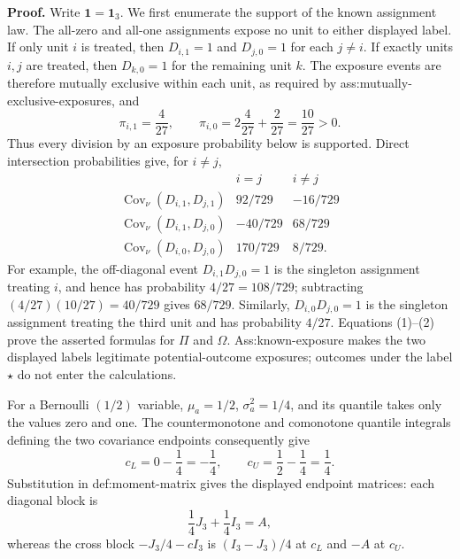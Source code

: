 \textbf{Proof.}
Write \(\mathbf 1=\mathbf 1_3\).  We first enumerate the support of the known assignment law.  The all-zero and all-one assignments expose no unit to either displayed label.  If only unit \(i\) is treated, then \(D_{i,1}=1\) and \(D_{j,0}=1\) for each \(j\ne i\).  If exactly units \(i,j\) are treated, then \(D_{k,0}=1\) for the remaining unit \(k\).  The exposure events are therefore mutually exclusive within each unit, as required by ass:mutually-exclusive-exposures, and
\[
 \pi_{i,1}=\frac{4}{27},
 \qquad
 \pi_{i,0}=2\frac{4}{27}+\frac{2}{27}=\frac{10}{27}>0.
 \tag{1}
\]
Thus every division by an exposure probability below is supported.  Direct intersection probabilities give, for \(i\ne j\),
\[
\begin{array}{c|cc}
 &i=j&i\ne j\\ \hline
 \operatorname{Cov}_{\nu}(D_{i,1},D_{j,1})&92/729&-16/729\\
 \operatorname{Cov}_{\nu}(D_{i,1},D_{j,0})&-40/729&68/729\\
 \operatorname{Cov}_{\nu}(D_{i,0},D_{j,0})&170/729&8/729.
\end{array}
\tag{2}
\]
For example, the off-diagonal event \(D_{i,1}D_{j,0}=1\) is the singleton assignment treating \(i\), and hence has probability \(4/27=108/729\); subtracting \((4/27)(10/27)=40/729\) gives \(68/729\).  Similarly, \(D_{i,0}D_{j,0}=1\) is the singleton assignment treating the third unit and has probability \(4/27\).  Equations (1)--(2) prove the asserted formulas for \(\Pi\) and \(\Omega\).  Ass:known-exposure makes the two displayed labels legitimate potential-outcome exposures; outcomes under the label \(\star\) do not enter the calculations.

For a Bernoulli \((1/2)\) variable, \(\mu_a=1/2\), \(\sigma_a^2=1/4\), and its quantile takes only the values zero and one.  The countermonotone and comonotone quantile integrals defining the two covariance endpoints consequently give
\[
 c_L=0-\frac14=-\frac14,
 \qquad
 c_U=\frac12-\frac14=\frac14.
 \tag{3}
\]
Substitution in def:moment-matrix gives the displayed endpoint matrices: each diagonal block is
\[
 \frac14J_3+\frac14I_3=A,
\]
whereas the cross block \(-J_3/4-cI_3\) is \((I_3-J_3)/4\) at \(c_L\) and \(-A\) at \(c_U\).

